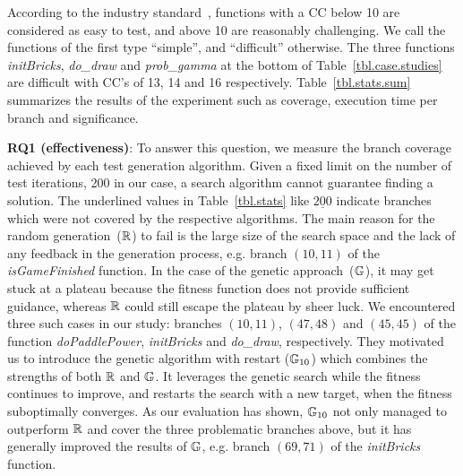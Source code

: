 According to the industry standard~\cite{bray1997c4}, functions with a CC below 10 are considered as easy to test, and above 10 are reasonably challenging. We call the functions of the first type ``simple'', and ``difficult'' otherwise. The three functions \mbox{\emph{initBricks}}, \emph{do_draw} and \emph{prob_gamma} at the bottom of Table~\ref{tbl.case.studies} are difficult with CC's of 13, 14 and 16 respectively. Table~\ref{tbl.stats.sum} summarizes the results of the experiment such as coverage, execution time per branch and significance.

\textbf{RQ1 (effectiveness)}: To answer this question, we measure the branch coverage achieved by each test generation algorithm. Given a fixed limit on the number of test iterations, 200 in our case, a search algorithm cannot guarantee finding a solution. The underlined values in Table~\ref{tbl.stats} like $\underline{200}$ indicate branches which were not covered by the respective algorithms. The main reason for the random generation~($\mathbb{R}$) to fail is the large size of the search space and the lack of any feedback in the generation process, e.g. branch $(10,11)$ of the \emph{isGameFinished} function. In the case of the genetic approach~($\mathbb{G}$), it  may get stuck at a plateau because the fitness function does not provide sufficient guidance, whereas $\mathbb{R}$ could still escape the plateau by sheer luck. We encountered three such cases in our study: branches $(10,11)$, $(47,48)$ and $(45,45)$ of the function \emph{doPaddlePower}, \emph{initBricks} and \emph{do_draw}, respectively. They motivated us to introduce the genetic algorithm with restart ($\mathbb{G}_{10}$) which combines the strengths of both $\mathbb{R}$ and $\mathbb{G}$. It leverages the genetic search while the fitness continues to improve, and restarts the search with a new target, when the fitness suboptimally converges. As our evaluation has shown, $\mathbb{G}_{10}$ not only managed to outperform $\mathbb{R}$ and cover the three problematic branches above, but it has generally improved the results of $\mathbb{G}$, e.g. branch $(69,71)$ of the \emph{initBricks} function.\\

